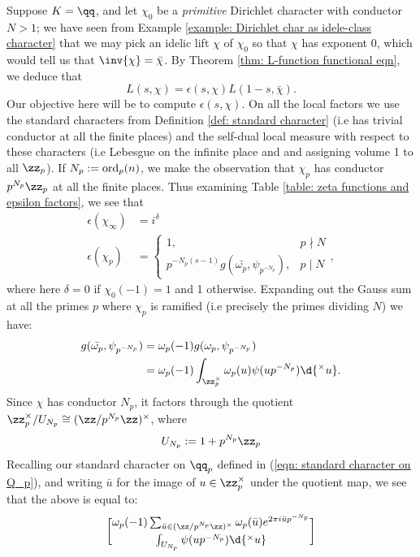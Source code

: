 \documentclass[11pt, x11names, openany]{book}
\begin{document}
\begin{example}
\label{example: Dirichlet L-function func-eqn}
Suppose $K = \qq$, and let $\chi_0$ be a \textit{primitive} Dirichlet character with conductor $N > 1$; we have seen from Example \ref{example: Dirichlet char as idele-class character} that we may pick an idelic lift $\chi$ of $\chi_0$ so that $\chi$ has exponent $0$, which would tell us that $\inv{\chi} = \bar{\chi}$.
By Theorem \ref{thm: L-function functional eqn}, we deduce that
\begin{equation*}
    L(s, \chi) = \epsilon(s, \chi) L(1-s, \bar{\chi}).
\end{equation*}
Our objective here will be to compute $\epsilon(s, \chi)$. On all the local factors we use the standard characters from Definition \ref{def: standard character} (i.e has trivial conductor at all the finite places) and the self-dual local measure with respect to these characters (i.e Lebesgue on the infinite place and and assigning volume 1 to all $\zz_p$). If $N_p := \operatorname{ord}_p(n)$, we make the observation that $\chi_p$ has conductor $p^{N_p} \zz_p$ at all the finite places. Thus examining Table \ref{table: zeta functions and epsilon factors}, we see that
\begin{align*}
    \epsilon(\chi_\infty) &= i^{\delta}\\
    \epsilon(\chi_p) &= \begin{cases}
    1, & p \nmid N\\
    p^{-N_p(s-1)} g(\bar{\omega_p}, \psi_{p^{-N_p}}), & p \mid N
    \end{cases},
\end{align*}
where here $\delta = 0$ if $\chi_0(-1) = 1$ and 1 otherwise. Expanding out the Gauss sum at all the primes $p$ where $\chi_p$ is ramified (i.e precisely the primes dividing $N$) we have:
\begin{align*}
    g(\bar{\omega_p}, \psi_{p^{-N_p}}) &= \omega_p(-1)g(\omega_p,  \psi_{p^{-N_p}})\\
    &= \omega_p(-1) \int_{\zz_p^\times} \omega_p(u) \psi(u p^{-N_p}) \d{^\times u}.
\end{align*} 
Since $\chi$ has conductor $N_p$, it factors through the quotient $\zz_p^\times/U_{N_p} \cong (\zz/p^{N_p} \zz)^\times$, where 
\begin{equation*}
    U_{N_p} := 1 + p^{N_p} \zz_p
\end{equation*}
Recalling our standard character on $\qq_p$ defined in (\ref{eqn: standard character on Q_p}), and writing $\bar{u}$ for the image of $u \in \zz_p^\times$ under the quotient map, we see that the above is equal to:
\begin{align*}
\omega_p(-1) \sum_{\bar{u} \in (\zz/p^{N_p} \zz)^\times} \omega_p(\bar{u}) e^{2 \pi i \bar{u} p^{-N_p}} \brack{\int_{U_{N_p}} \psi(u p^{-N_p}) \d{^\times u}}
\end{align*}


\end{example}
\end{document}
